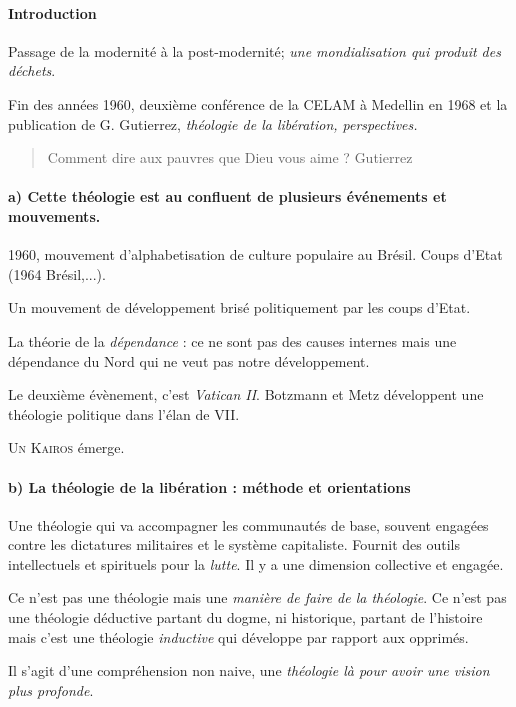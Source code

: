 \paragraph{Introduction}
Passage de la modernité à la post-modernité; \textit{une mondialisation qui produit des déchets}.

Fin des années 1960, deuxième conférence de la CELAM à Medellin en 1968 et la publication de G. Gutierrez, \textit{théologie de la libération, perspectives.}

\begin{quote}
    Comment dire aux pauvres que Dieu vous aime ? Gutierrez
\end{quote}

\paragraph{a) Cette théologie est au confluent de plusieurs événements et mouvements.} 1960, mouvement d'alphabetisation de culture populaire au Brésil. 
Coups d'Etat (1964 Brésil,...).

\begin{Synthesis}
    Un mouvement de développement brisé politiquement par les coups d'Etat.
\end{Synthesis}

La théorie de la \textit{dépendance} : ce ne sont pas des causes internes mais une dépendance du Nord qui ne veut pas notre développement.

Le deuxième évènement, c'est \textit{Vatican II}. Botzmann et Metz développent une théologie politique dans l'élan de VII. 

\textsc{Un Kairos} émerge.

\paragraph{b) La théologie de la libération : méthode et orientations}
Une théologie qui va accompagner les communautés de base, souvent engagées contre les dictatures militaires et le système capitaliste. Fournit des outils intellectuels et spirituels pour la \textit{lutte}. Il y a une dimension collective et engagée.

Ce n'est pas une théologie mais une \textit{manière de faire de la théologie}. Ce n'est pas une théologie déductive partant du dogme, ni historique, partant de l'histoire mais c'est une théologie \textit{inductive} qui développe par rapport aux opprimés. 

Il s'agit d'une compréhension non naive, une \textit{théologie là pour avoir une vision plus profonde}.

